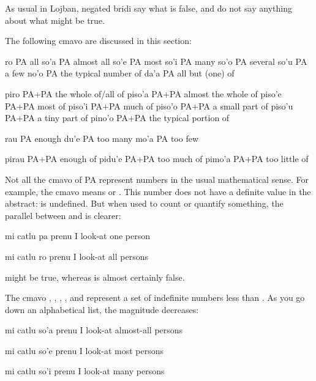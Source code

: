 As usual in Lojban, negated bridi say what is false, and do
    not say anything about what might be true.



The following cmavo are discussed in this section:

   ro  PA  all
    so'a    PA  almost all
    so'e    PA  most
    so'i    PA  many
    so'o    PA  several
    so'u    PA  a few
    no'o    PA  the typical number of
    da'a    PA  all but (one) of

piro    PA+PA   the whole of/all of
    piso'a  PA+PA   almost the whole of
    piso'e  PA+PA   most of
    piso'i  PA+PA   much of
    piso'o  PA+PA   a small part of
    piso'u  PA+PA   a tiny part of
    pino'o  PA+PA   the typical portion of

rau PA  enough
    du'e    PA  too many
    mo'a    PA  too few

pirau   PA+PA   enough of
    pidu'e  PA+PA   too much of
    pimo'a  PA+PA   too little of

Not all the cmavo of PA represent numbers in the usual
    mathematical sense. For example, the cmavo  means 
    or . This number does not have a definite value in the
    abstract:  is undefined. But when used to count or
    quantify something, the parallel between  and  is
    clearer:
\begin{example}
mi catlu pa prenu\n
I look-at one person
\end{example}

\begin{example}
mi catlu ro prenu\n
I look-at all persons
\end{example}

 might be true, whereas  is almost certainly false. 

The cmavo , , , , and
     represent a set of indefinite numbers less than
    . As you go down an alphabetical list, the magnitude
    decreases:
\begin{example}
mi catlu so'a prenu\n
I look-at almost-all persons
\end{example}

\begin{example}
mi catlu so'e prenu\n
I look-at most persons
\end{example}

\begin{example}
mi catlu so'i prenu\n
I look-at many persons
\end{example}

